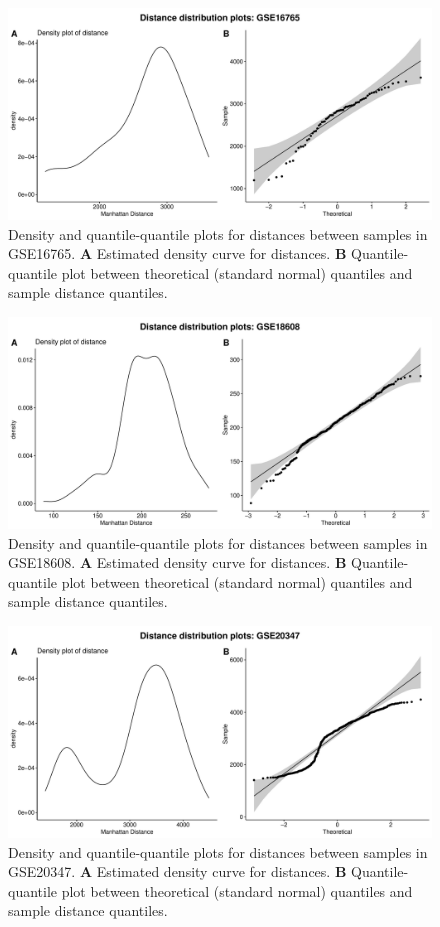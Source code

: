 \documentclass[10pt,letterpaper]{article}\usepackage[]{graphicx}\usepackage[]{color}
\begin{document}
\begin{figure}[H]
	\includegraphics[width=\textwidth]{manhattan-distance_hist_GSE16765.pdf}
	\caption{Density and quantile-quantile plots for distances between samples in GSE16765. \textbf{A} Estimated density curve for distances. \textbf{B} Quantile-quantile plot between theoretical (standard normal) quantiles and sample distance quantiles.}
\end{figure}

\begin{figure}[H]
	\includegraphics[width=\textwidth]{manhattan-distance_hist_GSE18608.pdf}
	\caption{Density and quantile-quantile plots for distances between samples in GSE18608. \textbf{A} Estimated density curve for distances. \textbf{B} Quantile-quantile plot between theoretical (standard normal) quantiles and sample distance quantiles.}
\end{figure}

\begin{figure}[H]
	\includegraphics[width=\textwidth]{manhattan-distance_hist_GSE20347.pdf}
	\caption{Density and quantile-quantile plots for distances between samples in GSE20347. \textbf{A} Estimated density curve for distances. \textbf{B} Quantile-quantile plot between theoretical (standard normal) quantiles and sample distance quantiles.}
\end{figure}
\end{document}
